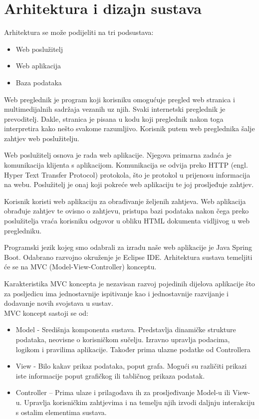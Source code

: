 \chapter{Arhitektura i dizajn sustava}
		
	Arhitektura se može podijeliti na tri podsustava: 
	\begin{itemize}
		\item Web poslužitelj 
		\item Web aplikacija 
		\item Baza podataka 
	\end{itemize}
	Web preglednik je program koji korisniku omogućuje pregled web stranica i multimedijalnih sadržaja vezanih uz njih. Svaki internetski preglednik je prevoditelj. Dakle, stranica je pisana u kodu koji preglednik nakon toga interpretira kako nešto svakome razumljivo. Korisnik putem web preglednika šalje zahtjev web poslužitelju. 
	
	Web poslužitelj osnova je rada web aplikacije. Njegova primarna zadaća je komunikacija klijenta s aplikacijom. Komunikacija se odvija preko HTTP (engl. Hyper Text Transfer Protocol) protokola, što je protokol u prijenosu informacija na webu. Poslužitelj je onaj koji pokreće web aplikaciju te joj prosljeđuje zahtjev. 
	
	Korisnik koristi web aplikaciju za obrađivanje željenih zahtjeva. Web aplikacija obrađuje zahtjev te ovisno o zahtjevu, pristupa bazi podataka nakon čega preko poslužitelja vraća korisniku odgovor u obliku HTML dokumenta vidljivog u web pregledniku. 
	
	Programski jezik kojeg smo odabrali za izradu naše web aplikacije je Java Spring Boot. Odabrano razvojno okruženje je Eclipse IDE. Arhitektura sustava temeljiti će se na MVC (Model-View-Controller) konceptu. 
	
	Karakteristika MVC koncepta je nezavisan razvoj pojedinih dijelova aplikacije što za posljedicu ima jednostavnije ispitivanje kao i jednostavnije razvijanje i dodavanje novih svojstava u sustav. \\
	
	MVC koncept sastoji se od: 
	\begin{itemize}
		\item Model - Središnja komponenta sustava. Predstavlja dinamičke strukture podataka, neovisne o korisničkom sučelju. Izravno upravlja podacima, logikom i pravilima aplikacije. Također prima ulazne podatke od Controllera 
		\item View - Bilo kakav prikaz podataka, poput grafa. Mogući su različiti prikazi iste informacije poput grafičkog ili tabličnog prikaza podatak. 
		\item Controller – Prima ulaze i prilagođava ih za prosljeđivanje Model-u ili View-u. Upravlja korisničkim zahtjevima i na temelju njih izvodi daljnju interakciju s ostalim elementima sustava. 
	\end{itemize}
		

